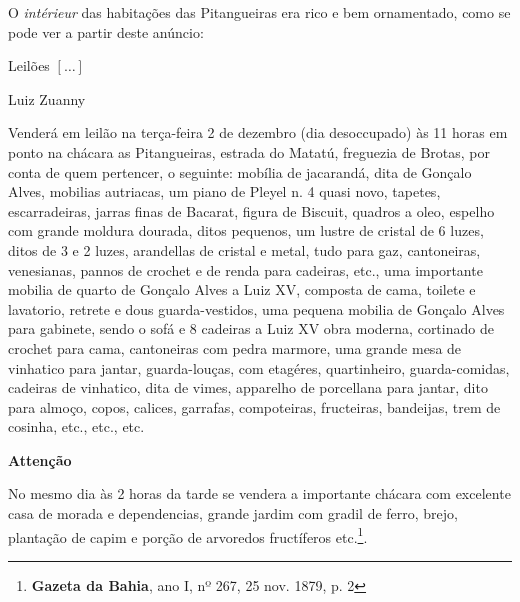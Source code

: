 O \textit{intérieur} das habitações das Pitangueiras era rico e bem ornamentado, como se pode ver a partir deste anúncio:

\begin{citacao}
Leilões \([\dots]\)

Luiz Zuanny 

Venderá em leilão na terça-feira 2 de dezembro (dia desoccupado) às 11 horas em ponto na chácara as Pitangueiras, estrada do Matatú, freguezia de Brotas, por conta de quem pertencer, o seguinte: mobília de jacarandá, dita de Gonçalo Alves, mobilias autriacas, um piano de Pleyel n. 4 quasi novo, tapetes, escarradeiras, jarras finas de Bacarat, figura de Biscuit, quadros a oleo, espelho com grande moldura dourada, ditos pequenos, um lustre de cristal de 6 luzes, ditos de 3 e 2 luzes, arandellas de cristal e metal, tudo para gaz, cantoneiras, venesianas, pannos de crochet e de renda para cadeiras, etc., uma importante mobilia de quarto de Gonçalo Alves a Luiz XV, composta de cama, toilete e lavatorio, retrete e dous guarda-vestidos, uma pequena mobilia de Gonçalo Alves para gabinete, sendo o sofá e 8 cadeiras a Luiz XV obra moderna, cortinado de crochet para cama, cantoneiras com pedra marmore, uma grande mesa de vinhatico para jantar, guarda-louças, com etagéres, quartinheiro, guarda-comidas, cadeiras de vinhatico, dita de vimes, apparelho de porcellana para jantar, dito para almoço, copos, calices, garrafas, compoteiras, fructeiras, bandeijas, trem de cosinha, etc., etc., etc.

\textbf{Attenção}

No mesmo dia às 2 horas da tarde se vendera a importante chácara com excelente casa de morada e dependencias, grande jardim com gradil de ferro, brejo, plantação de capim e porção de arvoredos fructíferos etc.\footnote{\textbf{Gazeta da Bahia}, ano I, nº 267, 25 nov. 1879, p. 2}.
\end{citacao}

